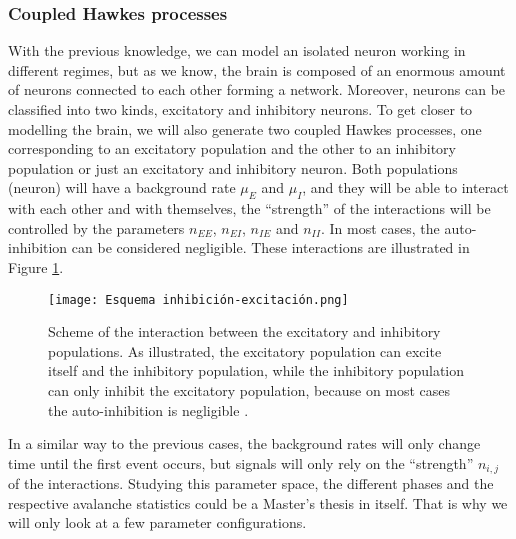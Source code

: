 \subsubsection{Coupled Hawkes processes} \label{subsubsec:Coupled_Hawkes_processes}
With the previous knowledge, we can model an isolated neuron working in different regimes, but as we know, the brain is composed of an enormous amount of neurons connected to each 
other forming a network. Moreover, neurons can be classified into two kinds, excitatory and inhibitory neurons. To get closer to modelling the brain, we will also generate two coupled
Hawkes processes, one corresponding to an excitatory population and the other to an inhibitory population or just an excitatory and inhibitory neuron. 
Both populations (neuron) will have a background rate $\mu_E$ and $\mu_I$, and they will be able to interact with each other and with themselves, the ``strength'' of the interactions 
will be controlled by the parameters $n_{EE}$, $n_{EI}$, $n_{IE}$ and $n_{II}$. In most cases, the auto-inhibition can be considered negligible. 
These interactions are illustrated in Figure \ref{f: Hawkes coupled}.  

\begin{figure}[H]
\centering
\texttt{[image: Esquema inhibición-excitación.png]}
\caption{Scheme of the interaction between the excitatory and inhibitory populations. As illustrated, the excitatory population can excite itself and the inhibitory population, while the
inhibitory population can only inhibit the excitatory population, because on most cases the auto-inhibition is negligible \cite{kalle2018growing}.}
\label{f: Hawkes coupled}
\end{figure}

In a similar way to the previous cases, the background rates will only change time until the first event occurs, but signals will only rely on the ``strength'' $n_{i,j}$ of the interactions.
Studying this parameter space, the different phases and the respective avalanche statistics could be a Master's thesis in itself. That is why we will only look at a few parameter 
configurations.

